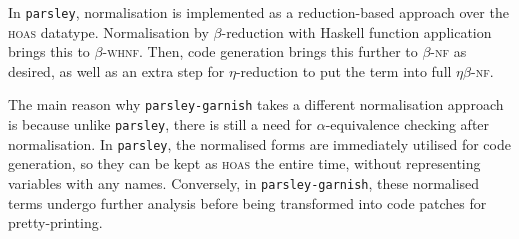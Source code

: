 \documentclass[../../../main.tex]{subfiles}
\begin{document}
In \texttt{parsley}, normalisation is implemented as a reduction-based approach over the \textsc{hoas}  datatype.
Normalisation by $\beta$-reduction with Haskell function application brings this to $\beta$-\textsc{whnf}.
Then, code generation brings this further to $\beta$-\textsc{nf} as desired, as well as an extra step for $\eta$-reduction to put the term into full $\eta\beta$-\textsc{nf}.

The main reason why \texttt{parsley-garnish} takes a different normalisation approach is because unlike \texttt{parsley}, there is still a need for $\alpha$-equivalence checking after normalisation.
In \texttt{parsley}, the normalised forms are immediately utilised for code generation, so they can be kept as \textsc{hoas} the entire time, without representing variables with any names.
Conversely, in \texttt{parsley-garnish}, these normalised terms undergo further analysis before being transformed into code patches for pretty-printing.

\end{document}
